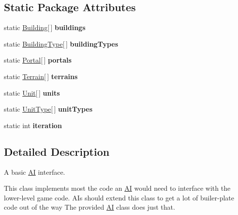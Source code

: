 \subsection*{Static Package Attributes}
\begin{CompactItemize}
\item 
\hypertarget{classBaseAI_926e4ea0d21e83c40c866aca231f9bfb}{
static \hyperlink{classBuilding}{Building}\mbox{[}$\,$\mbox{]} \textbf{buildings}}
\label{classBaseAI_926e4ea0d21e83c40c866aca231f9bfb}

\item 
\hypertarget{classBaseAI_89467168401b45cac54330db953c3127}{
static \hyperlink{classBuildingType}{BuildingType}\mbox{[}$\,$\mbox{]} \textbf{buildingTypes}}
\label{classBaseAI_89467168401b45cac54330db953c3127}

\item 
\hypertarget{classBaseAI_e916f205bfd024dc0ed704a382e72af9}{
static \hyperlink{classPortal}{Portal}\mbox{[}$\,$\mbox{]} \textbf{portals}}
\label{classBaseAI_e916f205bfd024dc0ed704a382e72af9}

\item 
\hypertarget{classBaseAI_6c6bf690012338f0284e2ec6ac85d4e2}{
static \hyperlink{classTerrain}{Terrain}\mbox{[}$\,$\mbox{]} \textbf{terrains}}
\label{classBaseAI_6c6bf690012338f0284e2ec6ac85d4e2}

\item 
\hypertarget{classBaseAI_72140772daaa7cd0a0fdab17cabc5b87}{
static \hyperlink{classUnit}{Unit}\mbox{[}$\,$\mbox{]} \textbf{units}}
\label{classBaseAI_72140772daaa7cd0a0fdab17cabc5b87}

\item 
\hypertarget{classBaseAI_db07b81437b69901c160762cbfb9dfd0}{
static \hyperlink{classUnitType}{UnitType}\mbox{[}$\,$\mbox{]} \textbf{unitTypes}}
\label{classBaseAI_db07b81437b69901c160762cbfb9dfd0}

\item 
\hypertarget{classBaseAI_d7942cee117a347f7cb841ff4800408f}{
static int \textbf{iteration}}
\label{classBaseAI_d7942cee117a347f7cb841ff4800408f}

\end{CompactItemize}


\subsection{Detailed Description}
A basic \hyperlink{classAI}{AI} interface. 

This class implements most the code an \hyperlink{classAI}{AI} would need to interface with the lower-level game code. AIs should extend this class to get a lot of builer-plate code out of the way The provided \hyperlink{classAI}{AI} class does just that. 

